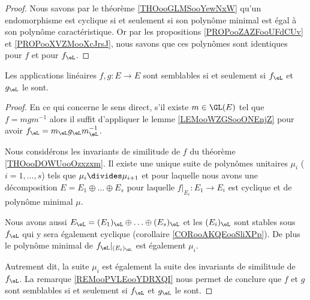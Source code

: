\begin{proof}
    Nous savons par le théorème \ref{THOooGLMSooYewNxW} qu'un endomorphisme est cyclique si et seulement si son polynôme minimal est égal à son polynôme caractéristique. Or par les propositions \ref{PROPooZAZFooUFdCUv} et \ref{PROPooXVZMooXcJrsJ}, nous savons que ces polynômes sont identiques pour \( f\) et pour \( f_{\eL}\).
\end{proof}

\begin{theorem}      \label{THOooHUFBooReKZWG}
    Les applications linéaires \( f,g\colon E\to E\) sont semblables si et seulement si \( f_{\eL}\) et \( g_{\eL}\) le sont.
\end{theorem}

\begin{proof}
    En ce qui concerne le sens direct, s'il existe \( m\in\GL(E)\) tel que \( f=mgm^{-1}\) alors il suffit d'appliquer le lemme \ref{LEMooWZGSooONEnjZ} pour avoir \( f_{\eL}=m_{\eL}g_{\eL}m_{\eL}^{-1}\).

    Nous considérons les invariants de similitude de \( f\) du théorème \ref{THOooDOWUooOzxzxm}. Il existe une unique suite de polynômes unitaires \( \mu_i\) ($i=1,\ldots, s$) tels que \( \mu_i\divides \mu_{i+1}\) et pour laquelle nous avons une décomposition \( E=E_1\oplus \ldots\oplus E_s\) pour laquelle \( f|_{E_i}\colon E_1\to E_i\) est cyclique et de polynôme minimal \( \mu\).

    Nous avons aussi \( E_{\eL}=(E_1)_{\eL}\oplus\ldots \oplus (E_s)_{\eL}\) et les \( (E_i)_{\eL}\) sont stables sous \( f_{\eL}\) qui y sera également cyclique (corollaire  \ref{CORooAKQEooSliXPp}). De plus le polynôme minimal de \( f_{\eL}|_{(E_i)_{\eL}}\) est également \( \mu_i\).

    Autrement dit, la suite \( \mu_i\) est également la suite des invariants de similitude de \( f_{\eL}\). La remarque \ref{REMooPVLEooYDRXQI} nous permet de conclure que \( f\) et \( g\) sont semblables si et seulement si \( f_{\eL}\) et \( g_{\eL}\) le sont.
\end{proof}
